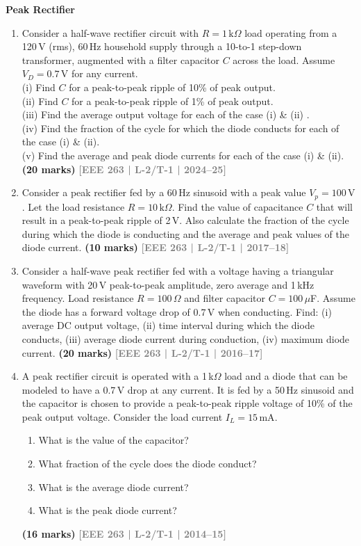 \documentclass[12pt]{article}
\newcommand{\yr}[1]{\hfill\textcolor{gray}{\small\textbf{[#1]}}}
\newcommand{\mk}[1]{\textcolor{orange!70!black}{\small\textbf{(#1 marks)}}}
\newcounter{subtopicbm}
\newcommand{\subtopic}[2]{%
  \stepcounter{subtopicbm}%
  \pdfbookmark[2]{#2}{subtopicbm.\thesubtopicbm}%
  \vspace{10pt}
  \noindent\begin{tcolorbox}[colback=#1!8,colframe=#1,boxrule=0.6pt,arc=4pt,
    left=6pt,right=6pt,top=4pt,bottom=4pt]
    \small\bfseries\textcolor{#1}{#2}
  \end{tcolorbox}
  \vspace{2pt}
}
\begin{document}
\subtopic{cA}{Peak Rectifier}\label{sub:s1-peak}

\begin{enumerate}
    
\item Consider a half-wave rectifier circuit with $R=1\,\text{k}\Omega$ load operating from a 120\,V (rms), 60\,Hz household supply through a 10-to-1 step-down transformer, augmented with a filter capacitor $C$ across the load. Assume $V_D=0.7\,\text{V}$ for any current. \\
(i) Find $C$ for a peak-to-peak ripple of 10\% of peak output.\\
 (ii) Find $C$ for a peak-to-peak ripple of 1\% of peak output. \\
 (iii) Find the average output voltage for each of the case (i) \& (ii) . \\
 (iv) Find the fraction of the cycle for which the diode conducts for each of the case (i) \& (ii).\\
 (v) Find the average and peak diode currents for each of the case (i) \& (ii).\\
\mk{20} \yr{EEE 263 | L-2/T-1 | 2024--25}


\item Consider a peak rectifier fed by a 60\,Hz sinusoid with a peak value $V_p=100\,\text{V}$. Let the load resistance $R=10\,\text{k}\Omega$. Find the value of capacitance $C$ that will result in a peak-to-peak ripple of 2\,V. Also calculate the fraction of the cycle during which the diode is conducting and the average and peak values of the diode current.
\mk{10} \yr{EEE 263 | L-2/T-1 | 2017--18}


\item Consider a half-wave peak rectifier fed with a voltage having a triangular waveform with 20\,V peak-to-peak amplitude, zero average and 1\,kHz frequency. Load resistance $R=100\,\Omega$ and filter capacitor $C=100\,\mu$F. Assume the diode has a forward voltage drop of 0.7\,V when conducting. Find: (i) average DC output voltage, (ii) time interval during which the diode conducts, (iii) average diode current during conduction, (iv) maximum diode current.
\mk{20} \yr{EEE 263 | L-2/T-1 | 2016--17}


\item A peak rectifier circuit is operated with a 1\,k$\Omega$ load and a diode that can be modeled to have a 0.7\,V drop at any current. It is fed by a 50\,Hz sinusoid and the capacitor is chosen to provide a peak-to-peak ripple voltage of 10\% of the peak output voltage. Consider the load current $I_L = 15\,\text{mA}$.
\begin{enumerate}
  \item What is the value of the capacitor?
  \item What fraction of the cycle does the diode conduct?
  \item What is the average diode current?
  \item What is the peak diode current?
\end{enumerate}
\mk{16} \yr{EEE 263 | L-2/T-1 | 2014--15}


\end{enumerate}
\end{document}
